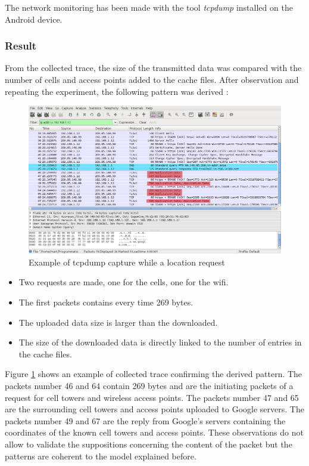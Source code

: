 The network monitoring has been made with the tool \emph{tcpdump} installed on the Android device.

\subsubsection{Result}

From the collected trace, the size of the transmitted data was compared with the number of cells and access points added to the cache files.
After observation and repeating the experiment, the following pattern was derived :

\begin{figure}[h]
  \hspace*{-2cm}
  \centering
  \includegraphics[width=17cm]{images/trace2.png}
  \caption{Example of tcpdump capture while a location request}
  \label{fig:loc-req-tcpdump}
\end{figure}

\begin{itemize}
\item Two requests are made, one for the cells, one for the wifi.
\item The first packets contains every time 269 bytes.
\item The uploaded data size is larger than the downloaded.
\item The size of the downloaded data is directly linked to the number of entries in the cache files.
\end{itemize}

Figure \ref{fig:loc-req-tcpdump} shows an example of collected trace confirming the derived pattern.
The packets number 46 and 64 contain 269 bytes and are the initiating packets of a request for cell towers and wireless access points.
The packets number 47 and 65 are the surrounding cell towers and access points uploaded to Google servers.
The packets number 49 and 67 are the reply from Google's servers containing the coordinates of the known cell towers and access points.
These observations do not allow to validate the suppositions concerning the content of the packet but the patterns are coherent to the model explained before.

